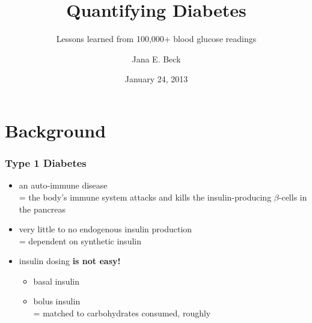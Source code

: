 \documentclass{beamer}
\author{Jana E. Beck}
\title{Quantifying Diabetes}
\subtitle{Lessons learned from 100,000+ blood glucose readings}
\date{January 24, 2013}
\begin{document}
\begin{frame}
\maketitle
\end{frame}

\section{Background}

\begin{frame}
  \frametitle{Type 1 Diabetes}

  \begin{itemize}
  \item an auto-immune disease\\
    = the body's immune system attacks and kills the insulin-producing $\beta$-cells in the
    pancreas
  \item very little to no endogenous insulin production\\
    = dependent on synthetic insulin
  \item insulin dosing \textbf{is not easy!}
    \begin{itemize}
    \item basal insulin
    \item bolus insulin\\
      = matched to carbohydrates consumed, roughly
    \end{itemize}
  \end{itemize}

\end{frame}
\end{document}

